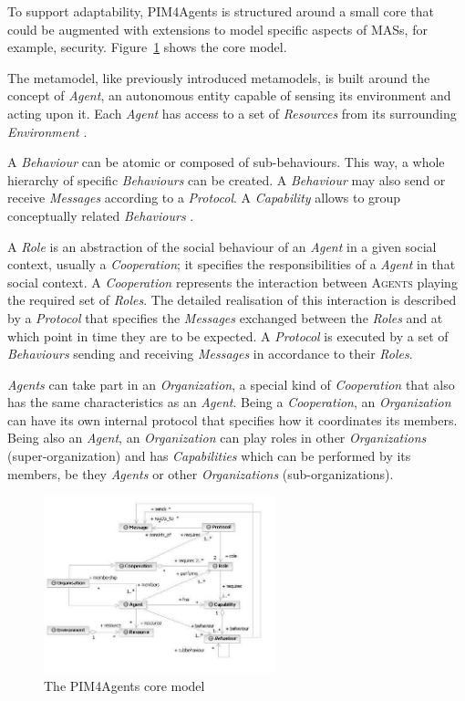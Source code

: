 To support adaptability, PIM4Agents is structured around a small core that could be augmented with extensions to model specific aspects of MASs, for example, security.
Figure~\ref{figure:pim4agents-metamodel} shows the core model.

The metamodel, like previously introduced metamodels, is built around the concept of \textit{Agent}, an autonomous entity capable of sensing its environment and acting upon it.
Each \textit{Agent} has access to a set of \textit{Resources} from its surrounding \textit{Environment} \cite{Hahn07b}.

A \textit{Behaviour} can be atomic or composed of sub-behaviours.
This way, a whole hierarchy of specific \textit{Behaviours} can be created.
A \textit{Behaviour} may also send or receive \textit{Messages} according to a \textit{Protocol}.
A \textit{Capability} allows to group conceptually related \textit{Behaviours} \cite{Hahn07b}.

A \textit{Role} is an abstraction of the social behaviour of an \textit{Agent} in a given social context, usually a \textit{Cooperation}; it specifies the responsibilities of a \textit{Agent} in that social context.
A \textit{Cooperation} represents the interaction between \textsc{Agents} playing the required set of \textit{Roles}.
The detailed realisation of this interaction is described by a \textit{Protocol} that specifies the \textit{Messages} exchanged between the \textit{Roles} and at which point in time they are to be expected.
A \textit{Protocol} is executed by a set of \textit{Behaviours} sending and receiving \textit{Messages} in accordance to their \textit{Roles}.

\textit{Agents} can take part in an \textit{Organization}, a special kind of \textit{Cooperation} that also has the same characteristics as an \textit{Agent}.
Being a \textit{Cooperation}, an \textit{Organization} can have its own internal protocol that specifies how it coordinates its members.
Being also an \textit{Agent}, an \textit{Organization} can play roles in other \textit{Organizations} (super-organization) and has \textit{Capabilities} which can be performed by its members, be they \textit{Agents} or other \textit{Organizations} (sub-organizations).

\begin{figure}[ht]
	\centering
	\includegraphics[width=0.6\textwidth]{images/pim4agents/pim4agents-metamodel.png}
	\caption{The PIM4Agents core model \cite{Hahn07b}}
	\label{figure:pim4agents-metamodel}
\end{figure}

